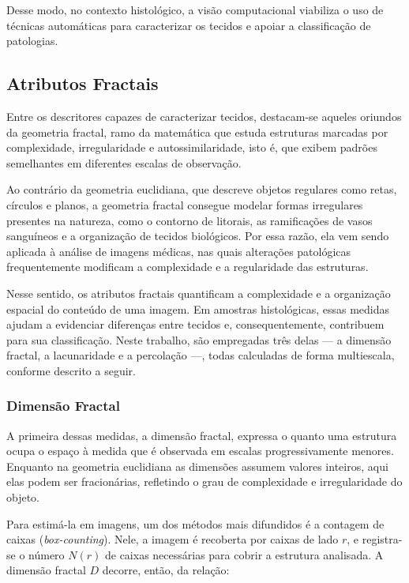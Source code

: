 Desse modo, no contexto histológico, a visão computacional viabiliza o uso de técnicas automáticas para caracterizar os tecidos e apoiar a classificação de patologias.

\subsection{Atributos Fractais}
\hspace{+15pt}

Entre os descritores capazes de caracterizar tecidos, destacam-se aqueles oriundos da geometria fractal, ramo da matemática que estuda estruturas marcadas por complexidade, irregularidade e autossimilaridade, isto é, que exibem padrões semelhantes em diferentes escalas de observação.

Ao contrário da geometria euclidiana, que descreve objetos regulares como retas, círculos e planos, a geometria fractal consegue modelar formas irregulares presentes na natureza, como o contorno de litorais, as ramificações de vasos sanguíneos e a organização de tecidos biológicos. %
Por essa razão, ela vem sendo aplicada à análise de imagens médicas, nas quais alterações patológicas frequentemente modificam a complexidade e a regularidade das estruturas.

Nesse sentido, os atributos fractais quantificam a complexidade e a organização espacial do conteúdo de uma imagem. Em amostras histológicas, essas medidas ajudam a evidenciar diferenças entre tecidos e, consequentemente, contribuem para sua classificação. Neste trabalho, são empregadas três delas — a dimensão fractal, a lacunaridade e a percolação —, todas calculadas de forma multiescala, conforme descrito a seguir.

\subsubsection{Dimensão Fractal}
\hspace{+15pt}

A primeira dessas medidas, a dimensão fractal, expressa o quanto uma estrutura ocupa o espaço à medida que é observada em escalas progressivamente menores. Enquanto na geometria euclidiana as dimensões assumem valores inteiros, aqui elas podem ser fracionárias, refletindo o grau de complexidade e irregularidade do objeto.

Para estimá-la em imagens, um dos métodos mais difundidos é a contagem de caixas (\textit{box-counting}). Nele, a imagem é recoberta por caixas de lado $r$, e registra-se o número $N(r)$ de caixas necessárias para cobrir a estrutura analisada. A dimensão fractal $D$ decorre, então, da relação:

